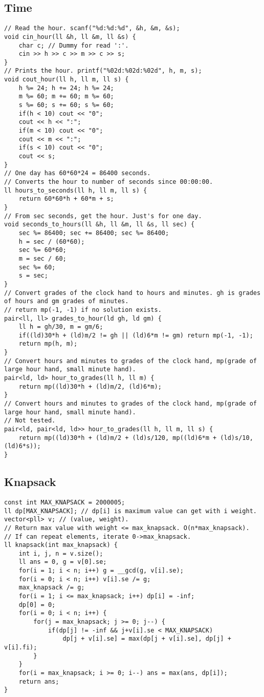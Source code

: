 \documentclass[a4paper]{article}
\begin{document}
\subsection*{Time}
\begin{verbatim}
// Read the hour. scanf("%d:%d:%d", &h, &m, &s);
void cin_hour(ll &h, ll &m, ll &s) {
    char c; // Dummy for read ':'.
    cin >> h >> c >> m >> c >> s;
}
// Prints the hour. printf("%02d:%02d:%02d", h, m, s);
void cout_hour(ll h, ll m, ll s) {
    h %= 24; h += 24; h %= 24;
    m %= 60; m += 60; m %= 60;
    s %= 60; s += 60; s %= 60;
    if(h < 10) cout << "0";
    cout << h << ":";
    if(m < 10) cout << "0";
    cout << m << ":";
    if(s < 10) cout << "0";
    cout << s; 
}
// One day has 60*60*24 = 86400 seconds.
// Converts the hour to number of seconds since 00:00:00.
ll hours_to_seconds(ll h, ll m, ll s) {
    return 60*60*h + 60*m + s;
}
// From sec seconds, get the hour. Just's for one day.
void seconds_to_hours(ll &h, ll &m, ll &s, ll sec) {
    sec %= 86400; sec += 86400; sec %= 86400;
    h = sec / (60*60);
    sec %= 60*60;
    m = sec / 60;
    sec %= 60;
    s = sec;
}
// Convert grades of the clock hand to hours and minutes. gh is grades of hours and gm grades of minutes.
// return mp(-1, -1) if no solution exists.
pair<ll, ll> grades_to_hour(ld gh, ld gm) {
    ll h = gh/30, m = gm/6;
    if((ld)30*h + (ld)m/2 != gh || (ld)6*m != gm) return mp(-1, -1);
    return mp(h, m);
}
// Convert hours and minutes to grades of the clock hand, mp(grade of large hour hand, small minute hand).
pair<ld, ld> hour_to_grades(ll h, ll m) {
    return mp((ld)30*h + (ld)m/2, (ld)6*m);
}
// Convert hours and minutes to grades of the clock hand, mp(grade of large hour hand, small minute hand).
// Not tested.
pair<ld, pair<ld, ld>> hour_to_grades(ll h, ll m, ll s) {
    return mp((ld)30*h + (ld)m/2 + (ld)s/120, mp((ld)6*m + (ld)s/10, (ld)6*s));
}
\end{verbatim}
\subsection*{Knapsack}
\begin{verbatim}
const int MAX_KNAPSACK = 2000005;
ll dp[MAX_KNAPSACK]; // dp[i] is maximum value can get with i weight.
vector<pll> v; // (value, weight).
// Return max value with weight <= max_knapsack. O(n*max_knapsack).
// If can repeat elements, iterate 0->max_knapsack.
ll knapsack(int max_knapsack) {
    int i, j, n = v.size();
    ll ans = 0, g = v[0].se;
    for(i = 1; i < n; i++) g = __gcd(g, v[i].se);
    for(i = 0; i < n; i++) v[i].se /= g;
    max_knapsack /= g;
    for(i = 1; i <= max_knapsack; i++) dp[i] = -inf;
    dp[0] = 0;
    for(i = 0; i < n; i++) {
        for(j = max_knapsack; j >= 0; j--) {
            if(dp[j] != -inf && j+v[i].se < MAX_KNAPSACK)
                dp[j + v[i].se] = max(dp[j + v[i].se], dp[j] + v[i].fi);
        }
    }
    for(i = max_knapsack; i >= 0; i--) ans = max(ans, dp[i]);
    return ans;
}
\end{verbatim}
\end{document}
